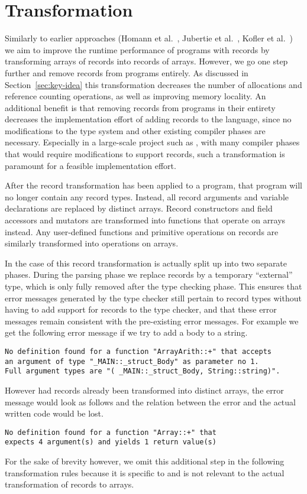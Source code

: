 
\section{Transformation}\label{sec:transform}

Similarly to earlier approaches (Homann et al.~\cite{SoA}, Jubertie et al.~\cite{AoSoA}, Kofler et al.~\cite{AoSoA2}) we aim to improve the runtime performance of programs with records by transforming arrays of records into records of arrays.
However, we go one step further and remove records from programs entirely.
As discussed in Section~\ref{sec:key-idea} this transformation decreases the number of allocations and reference counting operations, as well as improving memory locality.
An additional benefit is that removing records from programs in their entirety decreases the implementation effort of adding records to the language, since no modifications to the type system and other existing compiler phases are necessary.
Especially in a large-scale project such as \sac{}, with many compiler phases that would require modifications to support records, such a transformation is paramount for a feasible implementation effort.

After the record transformation has been applied to a program, that program will no longer contain any record types.
Instead, all record arguments and variable declarations are replaced by distinct arrays.
Record constructors and field accessors and mutators are transformed into functions that operate on arrays instead.
Any user-defined functions and primitive operations on records are similarly transformed into operations on arrays.

In the case of \sac{} this record transformation is actually split up into two separate phases.
During the parsing phase we replace records by a temporary ``external'' type, which is only fully removed after the type checking phase.
This ensures that error messages generated by the type checker still pertain to record types without having to add support for records to the type checker, and that these error messages remain consistent with the pre-existing error messages.
For example we get the following error message if we try to add a body to a string.
%
\begin{lstlisting}[language=red]
No definition found for a function "ArrayArith::+" that accepts
an argument of type "_MAIN::_struct_Body" as parameter no 1.
Full argument types are "( _MAIN::_struct_Body, String::string)".
\end{lstlisting}
%
However had records already been transformed into distinct arrays, the error message would look as follows and the relation between the error and the actual written code would be lost.
%
\begin{lstlisting}[language=red]
No definition found for a function "Array::+" that
expects 4 argument(s) and yields 1 return value(s)
\end{lstlisting}
%
For the sake of brevity however, we omit this additional step in the following transformation rules because it is specific to \sac{} and is not relevant to the actual transformation of records to arrays.

